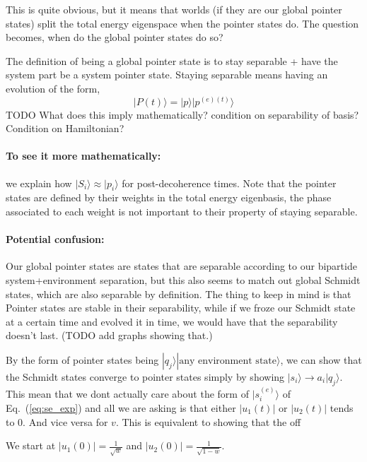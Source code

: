 \documentclass{article}
\begin{document}
This is quite obvious, but it means that worlds (if they are our global pointer states) split the total energy eigenspace when the pointer states do. The question becomes, when do the global pointer states do so? 

The definition of being a global pointer state is to stay separable + have the system part be a system pointer state.
Staying separable means having an evolution of the form, 
\begin{equation}
    |P(t)\rangle=|p\rangle|p^{(e)(t)}\rangle
\end{equation}
TODO What does this imply mathematically? condition on separability of basis? Condition on Hamiltonian?

\paragraph{To see it more mathematically:} we explain how $|S_i\rangle\approx|p_i\rangle$ for post-decoherence times. Note that the pointer states are defined by their weights in the total energy eigenbasis, the phase associated to each weight is not important to their property of staying separable.

\paragraph{Potential confusion:} Our global pointer states are states that are separable according to our bipartide system+environment separation, but this also seems to match out global Schmidt states, which are also separable by definition. The thing to keep in mind is that Pointer states are stable in their separability, while if we froze our Schmidt state at a certain time and evolved it in time, we would have that the separability doesn't last. (TODO add graphs showing that.)



By the form of pointer states being $|q_j\rangle|\text{any environment state}\rangle$, we can show that the Schmidt states converge to pointer states simply by showing $|s_i\rangle\rightarrow a_i|q_j\rangle$. This mean that we dont actually care about the form of $|s^{(e)}_i\rangle$ of Eq.~(\ref{eq:se_exp}) and all we are asking is that either $|u_1(t)|$ or $|u_2(t)|$ tends to 0. And vice versa for $v$. This is equivalent to showing that the off

We start at $|u_1(0)|=\frac{1}{\sqrt{w}}$ and $|u_2(0)|=\frac{1}{\sqrt{1-w}}$. 
\end{document}
